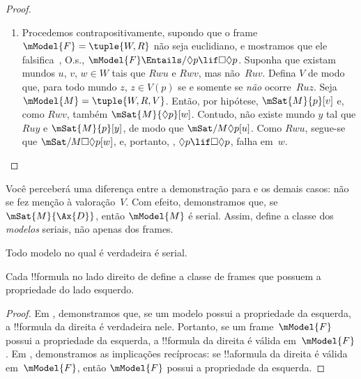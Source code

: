 \documentclass[../../../include/open-logic-section]{subfiles}
\begin{document}
\begin{proof}
\begin{enumerate}
    arbitrária nos demais casos). Seja $\mModel{M} =\tuple{W, R, V}$. Pela
    definição de $V$, $\mSat{M}{p}[z]$ para todo $z$ tal que $Ruz$ e,
    portanto, $\mSat{M}{\Box p}[u]$. Mas, pela hipótese ,
    $\Box p \lif \Box \Box p$ é verdadeira em $u$, de modo que
    $\mSat{M}{\Box \Box p}[u]$. Como $Ruv$ e $Rvw$, temos
    $\mSat{M}{p}[w]$; pela definição de~$V$, porém, isso só é possível se
    $Ruw$, como desejado.
  \item Procedemos contrapositivamente, supondo que o frame
    $\mModel{F} = \tuple{W, R}$ não seja euclidiano, e mostramos que ele
    falsifica~, O.s.\@,
    $\mModel{F} \Entails/ \Diamond p \lif \Box\Diamond p$. Suponha que existam
    mundos $u$, $v$, $w \in W$ tais que $Rwu$ e $Rwv$, mas não~$Ruv$. Defina
    $V$ de modo que, para todo mundo $z$, $z \in V(p)$ se e somente se
    \emph{não} ocorre~$Ruz$. Seja $\mModel{M} =\tuple{W, R, V}$. Então, por
    hipótese, $\mSat{M}{p}[v]$ e, como $Rwv$, também
    $\mSat{M}{\Diamond p}[w]$. Contudo, não existe mundo $y$ tal que $Ruy$ e
    $\mSat{M}{p}[y]$, de modo que $\mSat/{M}{\Diamond p}[u]$. Como $Rwu$,
    segue-se que $\mSat/{M}{\Box\Diamond p}[w]$, e, portanto, ,
    $\Diamond p \lif \Box\Diamond p$, falha em~$w$.
  \end{enumerate}
\end{proof}

Você perceberá uma diferença entre a demonstração para  e os demais
casos: não se fez menção à valoração~$V$. Com efeito, demonstramos que, se
$\mSat{M}{\Ax{D}}$, então $\mModel{M}$ é serial. Assim,  define a classe
dos \emph{modelos} seriais, não apenas dos frames.

\begin{cor}
  Todo modelo no qual  é verdadeira é serial.
\end{cor}

\begin{cor}
Cada !!{formula} no lado direito de  define a classe de
frames que possuem a propriedade do lado esquerdo.
\end{cor}

\begin{proof}
  Em , demonstramos que, se um modelo possui a
  propriedade da esquerda, a !!{formula} da direita é verdadeira nele.
  Portanto, se um frame~$\mModel{F}$ possui a propriedade da esquerda, a
  !!{formula} da direita é válida em~$\mModel{F}$. Em
  , demonstramos as implicações recíprocas: se
  !!a{formula} da direita é válida em~$\mModel{F}$, então $\mModel{F}$ possui
  a propriedade da esquerda.
\end{proof}
\end{document}
